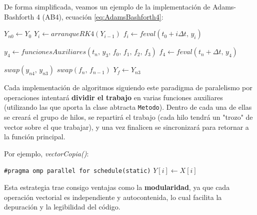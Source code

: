 De forma simplificada, veamos un ejemplo de la implementación de Adams-Bashforth 4 (AB4), ecuación \ref{eq:AdamsBashforth4}:

\begin{algorithm}[H]
	\begin{algorithmic}
		\State $ Y_{n0} \gets Y_0 $
			\State $ Y_i \gets arranqueRK4(Y_{i-1})$
		\EndFor
			\State $ f_i \gets feval(t_0+{i\Delta t}\text{, }y_i) $
		\EndFor
		
		
			\State $ y_4 \gets funcionesAuxiliares(t_n\text{, }y_3\text{, }f_0\text{, }f_1\text{, }f_2\text{, }f_3) $
			\State $ f_4 \gets feval(t_n+\Delta t\text{, }y_4) $
			
			\State $ swap(y_{n4}\text{, }y_{n3}) $
				\State $ swap(f_n\text{, }f_{n-1}) $
			\EndFor
		\EndFor
		\State $Y_f \gets Y_{n3}$
	\end{algorithmic}
	\caption{Implementación de AB4 con Paralelismo por Operaciones}
	\label{alg:AB4ParalelismoOperaciones}
\end{algorithm}

Cada implementación de algoritmos siguiendo este paradigma de paralelismo por operaciones intentará \textbf{dividir el trabajo} en varias funciones auxiliares (utilizando las que aporta la clase abtracta \texttt{Metodo}). Dentro de cada una de ellas se creará el grupo de hilos, se repartirá el trabajo (cada hilo tendrá un "trozo" de vector sobre el que trabajar), y una vez finalicen se sincronizará para retornar a la función principal. 

Por ejemplo, \textit{vectorCopia()}:

\begin{algorithm}[H]
	\begin{algorithmic}
		\State \verb|#pragma omp parallel for schedule(static)|
		\For{ $ i \text{=} 0 \text{; }i < neqn\text{; }\text{++}i $ }
			\State $ Y[i] \gets X[i] $
		\EndFor
		
	\end{algorithmic}
	\caption{Implementación de Función Auxiliar vectorCopia}
	\label{alg:VectorCopia-OMP}
\end{algorithm}

Esta estrategia trae consigo ventajas como la \textbf{modularidad}, ya que cada operación vectorial es independiente y autocontenida, lo cual facilita la depuración y la legibilidad del código.

